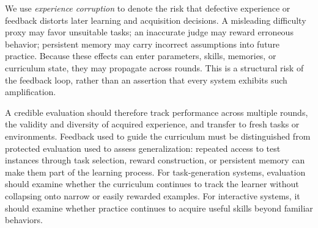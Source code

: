 We use \emph{experience corruption} to denote the risk that defective
experience or feedback distorts later learning and acquisition decisions.
A misleading difficulty proxy may favor unsuitable tasks; an inaccurate
judge may reward erroneous behavior; persistent memory may carry incorrect
assumptions into future practice.
Because these effects can enter parameters, skills, memories, or curriculum
state, they may propagate across rounds.
This is a structural risk of the feedback loop, rather than an assertion
that every system exhibits such amplification.

A credible evaluation should therefore track performance across multiple
rounds, the validity and diversity of acquired experience, and transfer to
fresh tasks or environments.
Feedback used to guide the curriculum must be distinguished from protected
evaluation used to assess generalization: repeated access to test instances
through task selection, reward construction, or persistent memory can make
them part of the learning process.
For task-generation systems, evaluation should examine whether the curriculum
continues to track the learner without collapsing onto narrow or easily
rewarded examples.
For interactive systems, it should examine whether practice continues to
acquire useful skills beyond familiar behaviors.

\begin{center}
\end{center}
